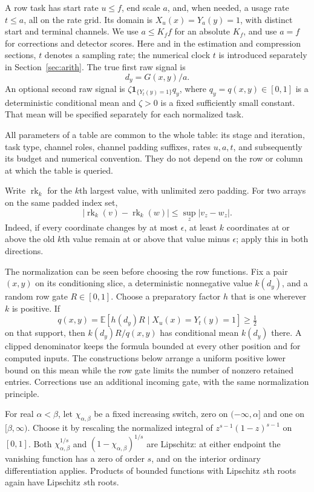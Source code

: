 A row task has start rate $u\le f$, end scale $a$, and, when needed, a
usage rate $t\le a$, all on the rate grid.  Its domain is
$X_u(x)=Y_a(y)=1$, with distinct start and terminal channels.  We use
$a\le K_f f$ for an absolute $K_f$, and use $a=f$ for corrections and
detector scores.  Here and in the estimation and compression sections,
$t$ denotes a sampling rate; the numerical clock $t$ is introduced
separately in Section~\ref{sec:arith}.  The true first raw signal is
\begin{equation}
 d_y=G(x,y)/a.
 \label{eq:atom-first-signal}
\end{equation}
An optional second raw signal is
$\zeta\mathbf1_{\{Y_t(y)=1\}}q_y$, where $q_y=q(x,y)\in[0,1]$ is a
deterministic conditional mean and $\zeta>0$ is a fixed sufficiently small
constant.  That mean will be specified separately for each normalized task.

All parameters of a table are common to the whole table: its stage and
iteration, task type, channel roles, channel padding suffixes, rates
$u,a,t$, and subsequently its budget and numerical convention.  They do
not depend on the row or column at which the table is queried.

Write $\operatorname{rk}_k$ for the $k$th largest value, with unlimited
zero padding.  For two arrays on the same padded index set,
\begin{equation}
 |\operatorname{rk}_k(v)-\operatorname{rk}_k(w)|
 \le\sup_z|v_z-w_z|.
 \label{eq:atom-rank-lipschitz}
\end{equation}
Indeed, if every coordinate changes by at most $\epsilon$, at least $k$
coordinates at or above the old $k$th value remain at or above that value
minus $\epsilon$; apply this in both directions.

The normalization can be seen before choosing the row functions.  Fix a
pair $(x,y)$ on its conditioning slice, a deterministic nonnegative value
$k(d_y)$, and a random row gate $R\in[0,1]$.  Choose a preparatory factor
$h$ that is one wherever $k$ is positive.  If
\[
 q(x,y)=\mathbb E[h(d_y)R\mid X_u(x)=Y_t(y)=1]\ge\tfrac12
\]
on that support, then $k(d_y)R/q(x,y)$ has conditional mean $k(d_y)$
there.  A clipped denominator keeps the formula bounded at every other
position and for computed inputs.  The constructions below arrange a
uniform positive lower bound on this mean while the row gate limits the
number of nonzero retained entries.  Corrections use an additional incoming
gate, with the same normalization principle.

For real $\alpha<\beta$, let $\chi_{\alpha,\beta}$ be a fixed increasing
switch, zero on $(-\infty,\alpha]$ and one on $[\beta,\infty)$.
Choose it by rescaling the normalized integral of
$z^{s-1}(1-z)^{s-1}$ on $[0,1]$.
Both $\chi_{\alpha,\beta}^{1/s}$ and
$(1-\chi_{\alpha,\beta})^{1/s}$ are Lipschitz: at either endpoint the
vanishing function has a zero of order $s$, and on the interior ordinary
differentiation applies.  Products of bounded functions with Lipschitz
$s$th roots again have Lipschitz $s$th roots.

